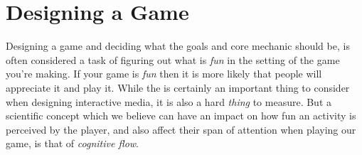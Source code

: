 \section{Designing a Game}
Designing a game and deciding what the goals and core mechanic should be, is often considered a task of figuring out
what is \emph{fun} in the setting of the game you're making.  If your game is \emph{fun} then it is more likely that
people will appreciate it and play it.
While the  is certainly an important thing to consider when designing interactive media, it is also
a hard \textit{thing} to measure. But a scientific concept which we believe can have an impact on how fun an activity
is perceived by the player, and also affect their span of attention when playing our game, is that of \textit{cognitive
flow}.


